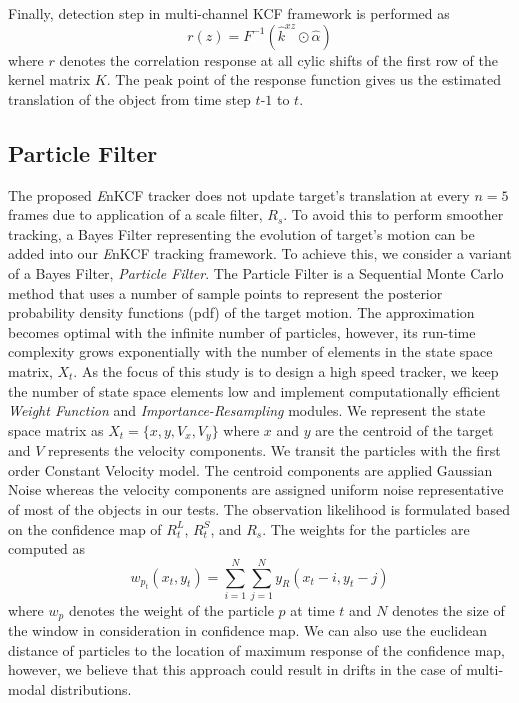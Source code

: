 \documentclass{bmvc2k}
\begin{document}
Finally, detection step in multi-channel KCF framework is performed as
\begin{equation}
r(z) = F^{-1}(\hat{k}^{xz} \odot \hat{\alpha})
\end{equation}
where $r$ denotes the correlation response at all cylic shifts of the
first row of the kernel matrix $K$. The peak point of the response
function gives us the estimated translation of the object from time
step $t$-$1$ to $t$.

\subsection{Particle Filter} \label{sc:PF}
The proposed {\it E}nKCF tracker does not update target's translation at every
$n=5$ frames due to application of a scale filter, $R_{s}$. To avoid this to perform 
smoother tracking, a Bayes Filter representing the evolution of target's motion can be added into our {\it E}nKCF tracking framework. To achieve this,
we consider a variant of a Bayes Filter, \textit{Particle Filter}. The Particle
Filter is a Sequential Monte Carlo method that uses a number of sample
points to represent the posterior probability density functions (pdf)
of the target motion.  The approximation becomes optimal with the
infinite number of particles, however, its run-time complexity grows
exponentially with the number of elements in the state space matrix,
$X_{t}$. As the focus of this study is to design a high speed tracker,
we keep the number of state space elements low and implement
computationally efficient \textit{Weight Function} and
\textit{Importance-Resampling} modules. We represent the state space
matrix as $X_{t} = \lbrace x,y,V_{x},V_{y}\rbrace$ where $x$ and $y$
are the centroid of the target and $V$ represents the velocity
components. We transit the particles with the first order Constant
Velocity model. The centroid components are applied Gaussian Noise
whereas the velocity components are assigned uniform noise
representative of most of the objects in our tests. The observation
likelihood is formulated based on the confidence map of $R_{t}^{L}$,
$R_{t}^{S}$, and $R_{s}$.  The weights for the particles are computed
as
\begin{equation}
	w_{p_{t}}(x_{t},y_{t}) = \sum_{i=1}^{N}\sum_{j=1}^{N} y_{R}(x_{t}-i,y_{t}-j)
\end{equation}
where $w_{p}$ denotes the weight of the particle $p$ at time $t$ and
$N$ denotes the size of the window in consideration in confidence map. We can also use
the euclidean distance of particles to the location of maximum response of 
the confidence map, however, we believe that this approach could result in drifts
in the case of multi-modal distributions.
 
\end{document}
